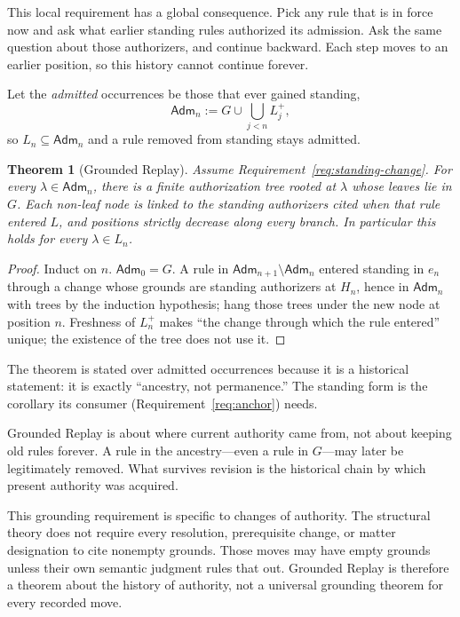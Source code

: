 \documentclass[11pt]{article}
\newtheorem{theorem}{Theorem}
\theoremstyle{definition}
\theoremstyle{remark}
\newcommand{\Adm}{\mathsf{Adm}}
\begin{document}
This local requirement has a global consequence. Pick any rule that is in force
now and ask what earlier standing rules authorized its admission. Ask the same
question about those authorizers, and continue backward. Each step moves to an
earlier position, so this history cannot continue forever.

Let the \emph{admitted} occurrences be those that ever gained standing,
\[
 \Adm_n:=G\cup\bigcup_{j<n}L_j^+ ,
\]
so $L_n\subseteq\Adm_n$ and a rule removed from standing stays admitted.

\begin{theorem}[Grounded Replay]\label{thm:replay}
Assume Requirement~\ref{req:standing-change}. For every $\lambda\in\Adm_n$,
there is a finite authorization tree rooted at $\lambda$ whose leaves lie in
$G$. Each non-leaf node is linked to the standing authorizers cited when that
rule entered $L$, and positions strictly decrease along every branch. In
particular this holds for every $\lambda\in L_n$.
\end{theorem}

\begin{proof}
Induct on $n$. $\Adm_0=G$. A rule in $\Adm_{n+1}\setminus\Adm_n$ entered
standing in $e_n$ through a change whose grounds are standing authorizers at
$H_n$, hence in $\Adm_n$ with trees by the induction hypothesis; hang those
trees under the new node at position $n$. Freshness of $L_n^+$ makes ``the
change through which the rule entered'' unique; the existence of the tree does
not use it.
\end{proof}

The theorem is stated over admitted occurrences because it is a historical
statement: it is exactly ``ancestry, not permanence.'' The standing form is
the corollary its consumer (Requirement~\ref{req:anchor}) needs.

Grounded Replay is about where current authority came from, not about keeping
old rules forever. A rule in the ancestry---even a rule in $G$---may later be
legitimately removed. What survives revision is the historical chain by which
present authority was acquired.

This grounding requirement is specific to changes of authority. The structural
theory does not require every resolution, prerequisite change, or matter
designation to cite nonempty grounds. Those moves may have empty grounds unless
their own semantic judgment rules that out. Grounded Replay is therefore a
theorem about the history of authority, not a universal grounding theorem for
every recorded move.
\end{document}
